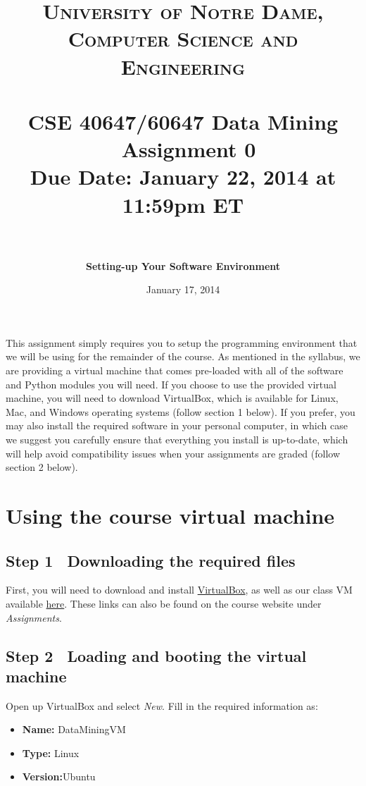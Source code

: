 \documentclass[paper=a4, fontsize=11pt]{scrartcl} %
\title{	
\normalfont \normalsize
\textsc{University of Notre Dame, Computer Science and Engineering} \\ [25pt] %
\horrule{0.5pt} \\[0.4cm] %
\huge CSE 40647/60647  Data Mining \textemdash~Assignment 0\\Due Date: January 22\ts{nd}, 2014 at 11:59pm ET \\ %
\horrule{2pt} \\[0.5cm] %
}
\author{\textbf{Setting-up Your Software Environment}} %
\date{\normalsize{January 17, 2014}} %
\numberwithin{equation}{section} %
\numberwithin{figure}{section} %
\numberwithin{table}{section} %
\begin{document}
\maketitle %


This assignment simply requires you to setup the programming environment that we will be using for the remainder of the course.
As mentioned in the syllabus, we are providing a virtual machine that comes pre-loaded with all of the software and Python modules you will need. If you choose to use the provided virtual machine, you will need to download VirtualBox, which is available for Linux, Mac, and Windows operating systems (follow section 1 below). If you prefer, you may also install the required software in your personal computer, in which case we suggest you carefully ensure that everything you install is up-to-date, which will help avoid compatibility issues when your assignments are graded (follow section 2 below).

\section{Using the course virtual machine}

\subsection*{Step 1 \textemdash~Downloading the required files}

First, you will need to download and install \href{https://www.virtualbox.org/wiki/Downloads}{VirtualBox}, as well as our class VM available \href{https://notredame.box.com/s/nvx1awtn7sddydw5abs6}{here}. These links can also be found on the course website under \textit{Assignments}.

\vspace{8pt}
\subsection*{Step 2 \textemdash~Loading and booting the virtual machine}

Open up VirtualBox and select \textit{New}. Fill in the required information as:
\begin{itemize}
\item \textbf{Name:} DataMiningVM \vspace{-8pt}
\item \textbf{Type:} Linux \vspace{-8pt}
\item \textbf{Version:}Ubuntu
\end{itemize}
\end{document}
